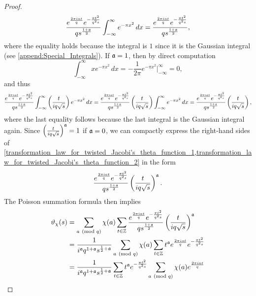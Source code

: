 \begin{proof}
        \begin{equation}\label{transformation_law_for_twisted_Jacobi's_theta_function_1}
          \frac{e^{\frac{2\pi iat}{q}}e^{-\frac{\pi t^{2}}{q^{2}s}}}{qs^{\frac{1+\mathfrak{a}}{2}}}\int_{-\infty}^{\infty}e^{-\pi x^{2}}\,dx = \frac{e^{\frac{2\pi iat}{q}}e^{-\frac{\pi t^{2}}{q^{2}s}}}{qs^{\frac{1+\mathfrak{a}}{2}}},
        \end{equation}
        where the equality holds because the integral is $1$ since it is the Gaussian integral (see \cref{append:Special_Integrals}). If $\mathfrak{a} = 1$, then by direct computation
        \[
          \int_{-\infty}^{\infty}xe^{-\pi x^{2}}\,dx = -\frac{1}{2\pi}e^{-\pi x^{2}}\bigg|_{-\infty}^{\infty} = 0,
        \]
        and thus
        \begin{equation}\label{transformation_law_for_twisted_Jacobi's_theta_function_2}
          \frac{e^{\frac{2\pi iat}{q}}e^{-\frac{\pi t^{2}}{q^{2}s}}}{qs^{\frac{1+\mathfrak{a}}{2}}}\int_{-\infty}^{\infty}\left(\frac{t}{iq\sqrt{s}}\right)e^{-\pi x^{2}}\,dx = \frac{e^{\frac{2\pi iat}{q}}e^{-\frac{\pi t^{2}}{q^{2}s}}}{qs^{\frac{1+\mathfrak{a}}{2}}}\left(\frac{t}{iq\sqrt{s}}\right)\int_{-\infty}^{\infty}e^{-\pi x^{2}}\,dx = \frac{e^{\frac{2\pi iat}{q}}e^{-\frac{\pi t^{2}}{q^{2}s}}}{qs^{\frac{1+\mathfrak{a}}{2}}}\left(\frac{t}{iq\sqrt{s}}\right),
        \end{equation}
        where the last equality follows because the last integral is the Gaussian integral again. Since $\left(\frac{t}{iq\sqrt{s}}\right)^{\mathfrak{a}} = 1$ if $\mathfrak{a} = 0$, we can compactly express the right-hand sides of \cref{transformation_law_for_twisted_Jacobi's_theta_function_1,transformation_law_for_twisted_Jacobi's_theta_function_2} in the form
        \[
          \frac{e^{\frac{2\pi iat}{q}}e^{-\frac{\pi t^{2}}{q^{2}s}}}{qs^{\frac{1+\mathfrak{a}}{2}}}\left(\frac{t}{iq\sqrt{s}}\right)^{\mathfrak{a}}.
        \]
        The Poisson summation formula then implies
        \begin{align*}
          \vt_{\chi}(s) &= \sum_{a \tmod{q}}\chi(a)\sum_{t \in \Z}\frac{e^{\frac{2\pi iat}{q}}e^{-\frac{\pi t^{2}}{q^{2}s}}}{qs^{\frac{1+\mf{a}}{2}}}\left(\frac{t}{iq\sqrt{s}}\right)^{\mf{a}} \\
          &= \frac{1}{i^{\mf{a}}q^{1+\mf{a}}s^{\frac{1}{2}+\mf{a}}}\sum_{a \tmod{q}}\chi(a)\sum_{t \in \Z}t^{\mf{a}}e^{\frac{2\pi i at}{q}}e^{-\frac{\pi t^{2}}{q^{2}s}} \\
          &= \frac{1}{i^{\mf{a}}q^{1+\mf{a}}s^{\frac{1}{2}+\mf{a}}}\sum_{t \in \Z}t^{\mf{a}}e^{-\frac{\pi t^{2}}{q^{2}s}}\sum_{a \tmod{q}}\chi(a)e^{\frac{2\pi i at}{q}} \\

\end{align*}
\end{proof}
